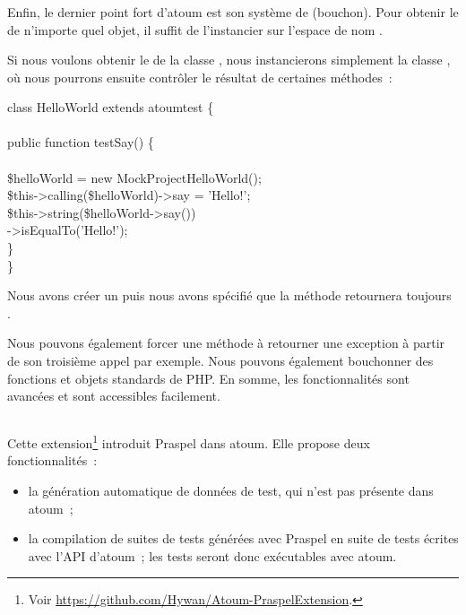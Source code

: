 \subsubsection{}

Enfin, le dernier point fort d'atoum est son système de 
(bouchon). Pour obtenir le  de n'importe quel objet, il suffit
de l'instancier sur l'espace de nom .

\begin{example}

Si nous voulons obtenir le  de la classe
, nous instancierons simplement la classe
, où nous pourrons ensuite
contrôler le résultat de certaines méthodes~:
%
\begin{pre}
class HelloWorld extends \bslash{}atoum\bslash{}test \{ \\
 \\
    public function testSay() \{ \\
 \\
        \$helloWorld = new \bslash{}Mock\bslash{}Project\bslash{}HelloWorld(); \\
        \$this->calling(\$helloWorld)->say = 'Hello!'; \\
        \$this->string(\$helloWorld->say()) \\
                  ->isEqualTo('Hello!'); \\
    \} \\
\}
\end{pre}
%
Nous avons créer un  puis nous avons spécifié que la méthode
 retournera toujours .

\end{example}

Nous pouvons également forcer une méthode à retourner une exception à partir de
son troisième appel par exemple. Nous pouvons également bouchonner des fonctions
et objets standards de PHP. En somme, les fonctionnalités sont avancées et sont
accessibles facilement.

\subsection{}

Cette extension\footnote{Voir
\url{https://github.com/Hywan/Atoum-PraspelExtension}.} introduit Praspel dans
atoum. Elle propose deux fonctionnalités~:
%
\begin{itemize}

\item la génération automatique de données de test, qui n'est pas présente dans
atoum~;

\item la compilation de suites de tests générées avec Praspel en suite de tests
écrites avec l'API d'atoum~; les tests seront donc exécutables avec atoum.

\end{itemize}

